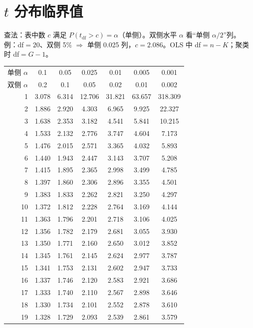 \section{\texorpdfstring{$t$}{t} 分布临界值}
查法：表中数 $c$ 满足 $P(t_{\mathrm{df}}>c)=\alpha$（单侧）。双侧水平 $\alpha$ 看“单侧 $\alpha/2$”列。例：df$=20$、双侧 5\% $\Rightarrow$ 单侧 0.025 列，$c=2.086$。OLS 中 df$=n-K$；聚类时 df$=G-1$。
\begin{center}\small\setlength{\tabcolsep}{7pt}\renewcommand{\arraystretch}{1.0}\label{tab:t}
\begin{tabular}{r|cccccc}\toprule
单侧 $\alpha$ & 0.1 & 0.05 & 0.025 & 0.01 & 0.005 & 0.001\\
双侧 $\alpha$ & 0.2 & 0.1 & 0.05 & 0.02 & 0.01 & 0.002\\\midrule
1 & 3.078 & 6.314 & 12.706 & 31.821 & 63.657 & 318.309\\
2 & 1.886 & 2.920 & 4.303 & 6.965 & 9.925 & 22.327\\
3 & 1.638 & 2.353 & 3.182 & 4.541 & 5.841 & 10.215\\
4 & 1.533 & 2.132 & 2.776 & 3.747 & 4.604 & 7.173\\
5 & 1.476 & 2.015 & 2.571 & 3.365 & 4.032 & 5.893\\
6 & 1.440 & 1.943 & 2.447 & 3.143 & 3.707 & 5.208\\
7 & 1.415 & 1.895 & 2.365 & 2.998 & 3.499 & 4.785\\
8 & 1.397 & 1.860 & 2.306 & 2.896 & 3.355 & 4.501\\
9 & 1.383 & 1.833 & 2.262 & 2.821 & 3.250 & 4.297\\
10 & 1.372 & 1.812 & 2.228 & 2.764 & 3.169 & 4.144\\
11 & 1.363 & 1.796 & 2.201 & 2.718 & 3.106 & 4.025\\
12 & 1.356 & 1.782 & 2.179 & 2.681 & 3.055 & 3.930\\
13 & 1.350 & 1.771 & 2.160 & 2.650 & 3.012 & 3.852\\
14 & 1.345 & 1.761 & 2.145 & 2.624 & 2.977 & 3.787\\
15 & 1.341 & 1.753 & 2.131 & 2.602 & 2.947 & 3.733\\
16 & 1.337 & 1.746 & 2.120 & 2.583 & 2.921 & 3.686\\
17 & 1.333 & 1.740 & 2.110 & 2.567 & 2.898 & 3.646\\
18 & 1.330 & 1.734 & 2.101 & 2.552 & 2.878 & 3.610\\
19 & 1.328 & 1.729 & 2.093 & 2.539 & 2.861 & 3.579\\

\end{tabular}
\end{center}
